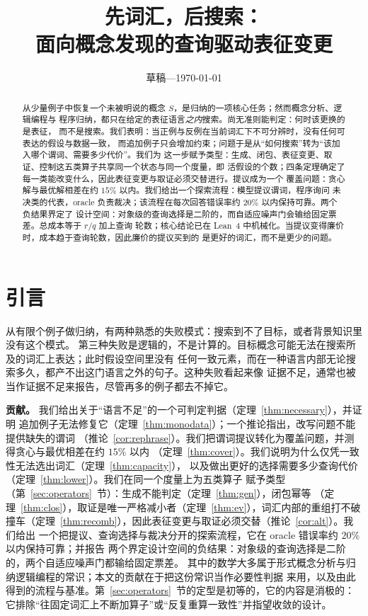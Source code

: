 \documentclass[11pt]{ctexart}
\title{先词汇，后搜索：\\ 面向概念发现的查询驱动表征变更}
\author{}
\date{草稿---\today}
\begin{document}
\maketitle

\begin{abstract}
从少量例子中恢复一个未被明说的概念 $S$，是归纳的一项核心任务；然而概念分析、逻辑编程与
程序归纳，都只在给定的表征语言\emph{之内}搜索。尚无准则能判定：何时该更换的是表征，
而不是搜索。我们表明：当正例与反例在当前词汇下不可分辨时，没有任何可表达的假设与数据一致，
而追加例子只会增加约束；问题于是从“如何搜索”转为“该加入哪个谓词、需要多少代价”。我们为
这一步赋予类型：生成、闭包、表征变更、取证、控制这五类算子共享同一个状态与同一个度量，即
活假设的个数；四条定理确定了每一类能改变什么，因此表征变更与取证必须交替进行。提议成为一个
覆盖问题：贪心解与最优解相差在约 $15\%$ 以内。我们给出一个探索流程：模型提议谓词，程序询问
未决类的代表，oracle 负责裁决；该流程在每次回答错误率约 $20\%$ 以内保持可靠。两个负结果界定了
设计空间：对象级的查询选择是二阶的，而自适应噪声门会输给固定票差。总成本等于 $r/q$ 加上查询
轮数；核心结论已在 Lean~4 中机械化。当提议变得廉价时，成本趋于查询轮数，因此廉价的提议买到的
是更好的词汇，而不是更少的问题。
\end{abstract}

\section{引言}

从有限个例子做归纳，有两种熟悉的失败模式：搜索到不了目标，或者背景知识里没有这个模式。
第三种失败是逻辑的，不是计算的。目标概念可能无法在搜索所及的词汇上表达；此时假设空间里没有
任何一致元素，而在一种语言内部无论搜索多久，都产不出这门语言之外的句子。这种失败看起来像
证据不足，通常也被当作证据不足来报告，尽管再多的例子都去不掉它。

\textbf{贡献。} 我们给出关于“语言不足”的一个可判定判据（定理~\ref{thm:necessary}），并证明
追加例子无法修复它（定理~\ref{thm:monodata}）；一个推论指出，改写问题不能提供缺失的谓词
（推论~\ref{cor:rephrase}）。我们把谓词提议转化为覆盖问题，并测得贪心与最优相差在约 $15\%$ 以内
（定理~\ref{thm:cover}）。我们说明为什么仅凭一致性无法选出词汇（定理~\ref{thm:capacity}），
以及做出更好的选择需要多少查询代价（定理~\ref{thm:lower}）。我们在同一个度量上为五类算子
赋予类型（第~\ref{sec:operators}~节）：生成不能判定（定理~\ref{thm:gen}），闭包幂等
（定理~\ref{thm:clos}），取证是唯一严格减小者（定理~\ref{thm:ev}），词汇内部的重组打不破
撞车（定理~\ref{thm:recomb}），因此表征变更与取证必须交替（推论~\ref{cor:alt}）。我们给出
一个把提议、查询选择与裁决分开的探索流程，它在 oracle 错误率约 $20\%$ 以内保持可靠；并报告
两个界定设计空间的负结果：对象级的查询选择是二阶的，两个自适应噪声门都输给固定票差。
其中的数学大多属于形式概念分析与归纳逻辑编程的常识；本文的贡献在于把这份常识当作必要性判据
来用，以及由此得到的流程与基准。第~\ref{sec:operators}~节的定型是初等的，它的内容是消极的：
它排除“往固定词汇上不断加算子”或“反复重算一致性”并指望收敛的设计。
\end{document}
